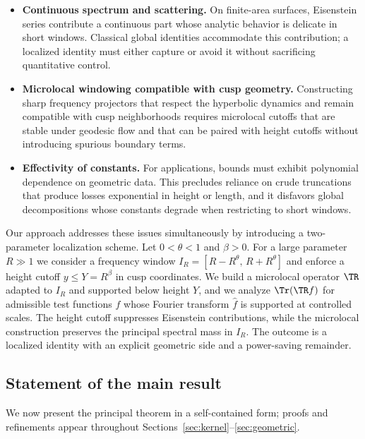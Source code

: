 \begin{itemize}
  \item \textbf{Continuous spectrum and scattering.} On finite-area surfaces, Eisenstein series contribute a continuous part whose analytic behavior is delicate in short windows. Classical global identities accommodate this contribution; a localized identity must either capture or avoid it without sacrificing quantitative control.
  \item \textbf{Microlocal windowing compatible with cusp geometry.} Constructing sharp frequency projectors that respect the hyperbolic dynamics and remain compatible with cusp neighborhoods requires microlocal cutoffs that are stable under geodesic flow and that can be paired with height cutoffs without introducing spurious boundary terms.
  \item \textbf{Effectivity of constants.} For applications, bounds must exhibit polynomial dependence on geometric data. This precludes reliance on crude truncations that produce losses exponential in height or length, and it disfavors global decompositions whose constants degrade when restricting to short windows.
\end{itemize}

Our approach addresses these issues simultaneously by introducing a two-parameter localization scheme. Let $0<\theta<1$ and $\beta>0$. For a large parameter $R\gg1$ we consider a frequency window $I_R=[R-R^\theta,\,R+R^\theta]$ and enforce a height cutoff $y\le Y=R^\beta$ in cusp coordinates. We build a microlocal operator $\TR$ adapted to $I_R$ and supported below height $Y$, and we analyze $\Tr(\TR f)$ for admissible test functions $f$ whose Fourier transform $\widehat{f}$ is supported at controlled scales. The height cutoff suppresses Eisenstein contributions, while the microlocal construction preserves the principal spectral mass in $I_R$. The outcome is a localized identity with an explicit geometric side and a power-saving remainder.

\subsection{Statement of the main result}

We now present the principal theorem in a self-contained form; proofs and refinements appear throughout Sections~\ref{sec:kernel}–\ref{sec:geometric}.

